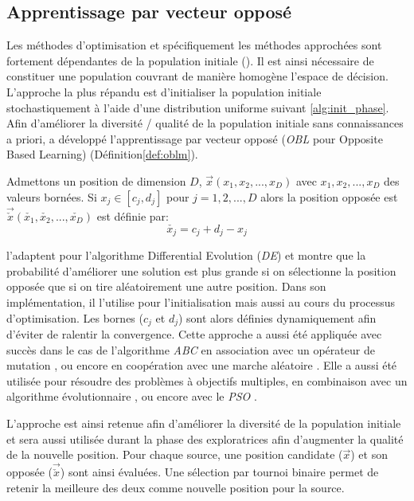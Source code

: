 \subsection{Apprentissage par vecteur opposé} %
\label{sub:apprentissage_par_vecteur_oppose}
Les méthodes d’optimisation et spécifiquement les méthodes approchées sont fortement
dépendantes de la population initiale (). Il est ainsi nécessaire
de constituer une population couvrant de manière homogène l’espace de décision.
L’approche la plus répandu est d’initialiser la population initiale stochastiquement
à l’aide d’une distribution uniforme suivant \eqref{alg:init_phase}.
Afin d’améliorer la diversité / qualité de la population initiale sans connaissances
a priori,\cite{Tizhoosh2005695} a développé l’apprentissage par vecteur opposé
(\textit{OBL} pour Opposite Based Learning) (Définition\ref{def:oblm}).

\begin{Def}\label{def:oblm}
Admettons un position de dimension $D$, $\vec{x}(x_{1}, x_{2}, ..., x_{D})$ avec
$x_{1}, x_{2}, ..., x_{D}$ des valeurs bornées. Si $x_{j} \in [c_{j}, d_{j}]$ pour
$j = 1, 2, ..., D$ alors la position opposée est $\vec{\check{x}}(\check{x_{1}},%
\check{x_{2}}, ..., \check{x_{D}})$ est définie par:
\[\check{x_{j}} = c_{j} + d_{j} - x_{j}\]
\end{Def}

\cite{Rahnamayan2008906} l’adaptent pour l’algorithme Differential Evolution (\textit{DE})
et montre que la probabilité d’améliorer une solution est plus grande si on sélectionne
la position opposée que si on tire aléatoirement une autre position.
Dans son implémentation, il l’utilise pour l’initialisation mais aussi au cours du
processus d’optimisation. Les bornes ($c_{j}$ et $d_{j}$) sont alors définies dynamiquement
afin d’éviter de ralentir la convergence.
Cette approche a aussi été appliquée avec succès dans le cas de l’algorithme \textit{ABC}
en association avec un opérateur de mutation \parencite{Bi2011174}, ou encore en coopération
avec une marche aléatoire \parencite{Sharma2012213}. Elle a aussi été utilisée pour
résoudre des problèmes à objectifs multiples, en combinaison avec un algorithme
évolutionnaire \parencite{Ma201448}, ou encore avec le \textit{PSO} \parencite{Gao2013114}.

L’approche est ainsi retenue afin d’améliorer la diversité de la population initiale
et sera aussi utilisée durant la phase des exploratrices afin d’augmenter la qualité
de la nouvelle position.
Pour chaque source, une position candidate ($\vec{x}$) et son opposée
($\vec{\check{x}}$) sont ainsi évaluées. Une sélection par tournoi binaire permet
de retenir la meilleure des deux comme nouvelle position pour la source.


